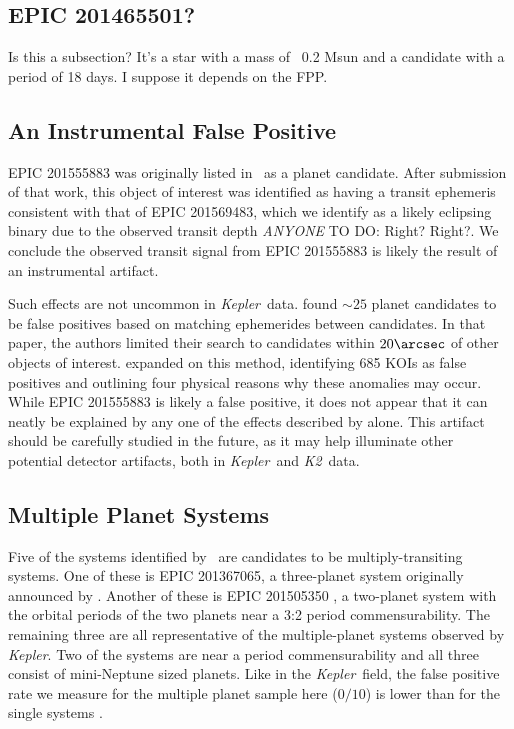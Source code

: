 \documentclass{emulateapj}
\newcommand{\project}[1]{\textsl{#1}}
\newcommand{\kep}{\project{Kepler}}
\newcommand{\KT}{\project{K2}}
\newcommand{\paperit}{\citet{Foreman-Mackey15}}
\newcommand{\todo}[3]{{\color{#2} \emph{#1} TO DO: #3}}
\newcommand{\anytodo}[1]{\todo{ANYONE}{NavyBlue}{#1}}
\begin{document}
\subsection{EPIC 201465501?}
Is this a subsection? It's a star with a mass of ~0.2 Msun and a candidate with
a period of 18 days. I suppose it depends on the FPP.

\subsection{An Instrumental False Positive}

EPIC 201555883 was originally listed in \paperit\ as a planet candidate.
After submission of that work, this object of interest was identified as 
having a transit ephemeris consistent with that of EPIC 201569483, 
which we identify as a likely eclipsing binary due to the observed transit
depth \anytodo{Right? Right?}. 
We conclude the observed transit signal from EPIC 201555883 is likely the result 
of an instrumental artifact.

Such effects are not uncommon in \kep\ data. 
\citet{Batalha13} found $\sim 25$ planet candidates to be false positives based on matching
ephemerides between candidates. 
In that paper, the authors limited their search to candidates within $20\arcsec$ of other
objects of interest. 
\citet{Coughlin14} expanded on this method, identifying 685 KOIs as false positives and 
outlining four physical reasons why these anomalies may occur.
While EPIC 201555883 is likely a false positive, it does not appear that it can neatly be
explained by any one of the effects described by \citet{Coughlin14} alone. 
This artifact should be carefully studied in the future, as it may help illuminate other 
potential detector artifacts, both in \kep\ and \KT\ data.


\subsection{Multiple Planet Systems}
Five of the systems identified by \paperit\ are candidates to be multiply-transiting
systems. 
One of these is EPIC 201367065, a three-planet system originally announced by
\citet{Crossfield15}. 
Another of these is EPIC 201505350 \citep{Armstrong15b}, a two-planet system with the
orbital periods of the two planets near a 3:2 period commensurability.
The remaining three are all representative of the multiple-planet systems observed by
\kep \citep{Lissauer11b, Fabrycky14}.
Two of the systems are near a period commensurability and all three consist of 
mini-Neptune sized planets.
Like in the \kep\ field, the false positive rate we measure for the multiple planet sample
here ($0/10$) is lower than for the single systems \citep{Lissauer12, Rowe14}.
\end{document}
